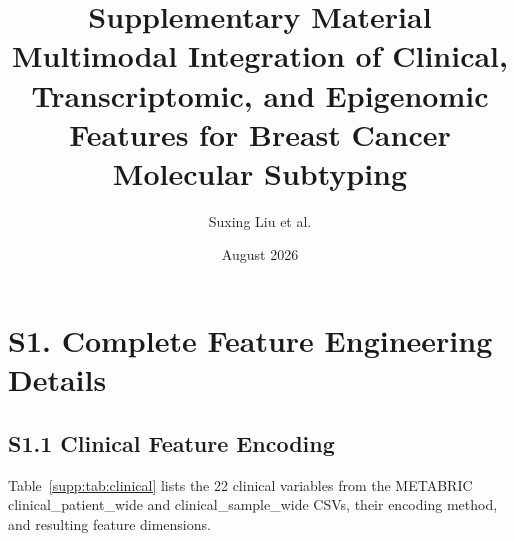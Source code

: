 \documentclass[11pt,a4paper]{article}
\begin{document}
\title{\textbf{Supplementary Material} \\
Multimodal Integration of Clinical, Transcriptomic, and Epigenomic Features for Breast Cancer Molecular Subtyping}

\author{Suxing Liu et al.}
\date{August 2026}
\maketitle

\section*{S1. Complete Feature Engineering Details}
\label{supp:features}

\subsection*{S1.1 Clinical Feature Encoding}

Table~\ref{supp:tab:clinical} lists the 22 clinical variables from the METABRIC clinical\_patient\_wide and clinical\_sample\_wide CSVs, their encoding method, and resulting feature dimensions.
\end{document}
